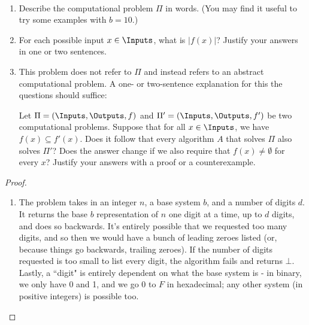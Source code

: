 \documentclass[11pt]{article}
\begin{document}
\begin{enumerate}
    
\begin{algorithm}[H]
    \\
    {
    \lElse{\Return{$\bot$}}}
\end{algorithm}


\begin{enumerate}
\item Describe the computational problem $\Pi$ in words.  (You may find it useful to try some examples with $b=10$.)
\item For each possible input $x\in \Inputs$, what is $|f(x)|$?  Justify your answers in one or two sentences.


\item This problem does not refer to $\Pi$ and instead refers to an abstract computational problem. A one- or two-sentence explanation for this the questions should suffice:

Let $\Pi=(\Inputs,\Outputs,f)$ and $\Pi'=(\Inputs,\Outputs,f')$ be two computational problems.  Suppose that for all $x\in \Inputs$, we have $f(x)\subseteq f'(x)$.  Does it follow that every algorithm $A$ that solves $\Pi$ also solves $\Pi'$?    Does the answer change if we also require that $f(x)\neq \emptyset$ for every $x$? Justify your answers with a proof or a counterexample.


\end{enumerate}

\begin{proof}
\begin{enumerate}

\item The problem takes in an integer $n$, a base system $b$, and a number of digits $d$. It returns the base $b$ representation of $n$ one digit at a time, up to $d$ digits, and does so backwards. It's entirely possible that we requested too many digits, and so then we would have a bunch of leading zeroes listed (or, because things go backwards, trailing zeroes). If the number of digits requested is too small to list every digit, the algorithm fails and returns $\bot$. Lastly, a ``digit" is entirely dependent on what the base system is - in binary, we only have 0 and 1, and we go 0 to $F$ in hexadecimal; any other system (in positive integers) is possible too.


\end{enumerate}
\end{proof}
\end{enumerate}
\end{document}

